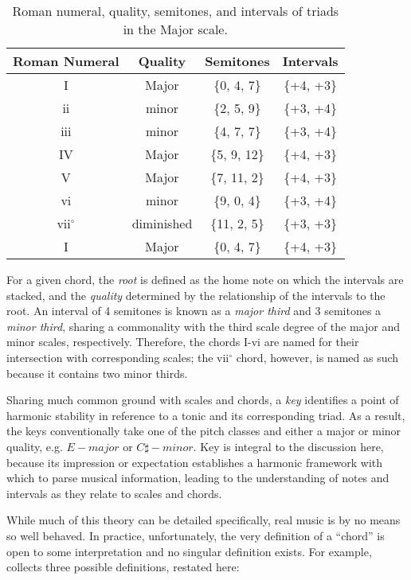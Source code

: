 \begin{table}[h!]
\begin{center}
\caption{Roman numeral, quality, semitones, and intervals of triads in the Major scale.}
\label{tab:major_triads}
\begin{tabular}{c | c | c | c }
Roman Numeral & Quality & Semitones & Intervals \\
\hline
I & Major & \{0, 4, 7\} & \{+4, +3\}\\
ii & minor & \{2, 5, 9\} & \{+3, +4\}\\
iii & minor & \{4, 7, 7\} & \{+3, +4\}\\
IV & Major & \{5, 9, 12\} & \{+4, +3\}\\
V & Major & \{7, 11, 2\} & \{+4, +3\}\\
vi & minor & \{9, 0, 4\} & \{+3, +4\}\\
vii$^\circ$ & diminished & \{11, 2, 5\} & \{+3, +3\}\\
I & Major & \{0, 4, 7\} & \{+4, +3\}\\
\hline
\end{tabular}
\end{center}
\end{table}

For a given chord, the \emph{root} is defined as the home note on which the intervals are stacked, and the \emph{quality} determined by the relationship of the intervals to the root.
An interval of 4 semitones is known as a \emph{major third} and 3 semitones a \emph{minor third}, sharing a commonality with the third scale degree of the major and minor scales, respectively.
Therefore, the chords I-vi are named for their intersection with corresponding scales; the vii$^\circ$ chord, however, is named as such because it contains two minor thirds.

Sharing much common ground with scales and chords, a \emph{key} identifies a point of harmonic stability in reference to a tonic and its corresponding triad.
As a result, the keys conventionally take one of the pitch classes and either a major or minor quality, e.g. $E-major$ or $C\sharp-minor$.
Key is integral to the discussion here, because its impression or expectation establishes a harmonic framework with which to parse musical information, leading to the understanding of notes and intervals as they relate to scales and chords.


While much of this theory can be detailed specifically, real music is by no means so well behaved.
In practice, unfortunately, the very definition of a ``chord'' is open to some interpretation and no singular definition exists.
For example, \cite{McVicar2013} collects three possible definitions, restated here:

